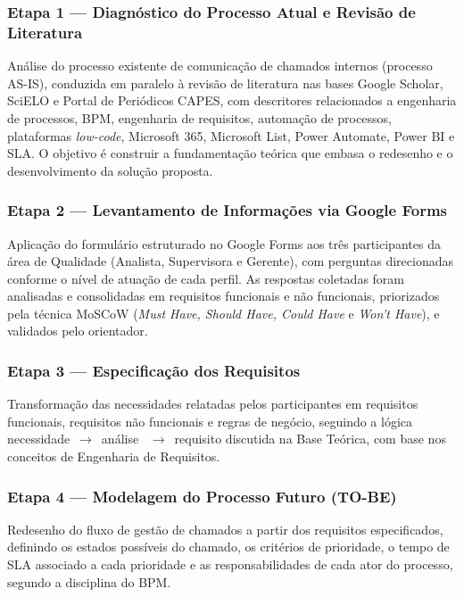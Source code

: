 \subsubsection{Etapa 1 --- Diagnóstico do Processo Atual e
Revisão de Literatura}

Análise do processo existente de comunicação de chamados
internos (processo AS-IS), conduzida em paralelo à revisão de
literatura nas bases Google Scholar, SciELO e Portal de
Periódicos CAPES, com descritores relacionados a engenharia
de processos, BPM, engenharia de requisitos, automação de
processos, plataformas \textit{low-code}, Microsoft 365,
Microsoft List, Power Automate, Power BI e SLA. O objetivo é
construir a fundamentação teórica que embasa o redesenho e o
desenvolvimento da solução proposta.

\subsubsection{Etapa 2 --- Levantamento de Informações via
Google Forms}

Aplicação do formulário estruturado no Google Forms aos três
participantes da área de Qualidade (Analista, Supervisora e
Gerente), com perguntas direcionadas conforme o nível de
atuação de cada perfil. As respostas coletadas foram
analisadas e consolidadas em requisitos funcionais e não
funcionais, priorizados pela técnica MoSCoW (\textit{Must
Have, Should Have, Could Have} e \textit{Won't Have}), e
validados pelo orientador.

\subsubsection{Etapa 3 --- Especificação dos Requisitos}

Transformação das necessidades relatadas pelos participantes
em requisitos funcionais, requisitos não funcionais e regras
de negócio, seguindo a lógica necessidade~$\rightarrow$~análise~
$\rightarrow$~requisito discutida na Base Teórica, com base
nos conceitos de Engenharia de Requisitos.

\subsubsection{Etapa 4 --- Modelagem do Processo Futuro
(TO-BE)}

Redesenho do fluxo de gestão de chamados a partir dos
requisitos especificados, definindo os estados possíveis do
chamado, os critérios de prioridade, o tempo de SLA associado
a cada prioridade e as responsabilidades de cada ator do
processo, segundo a disciplina do BPM.

